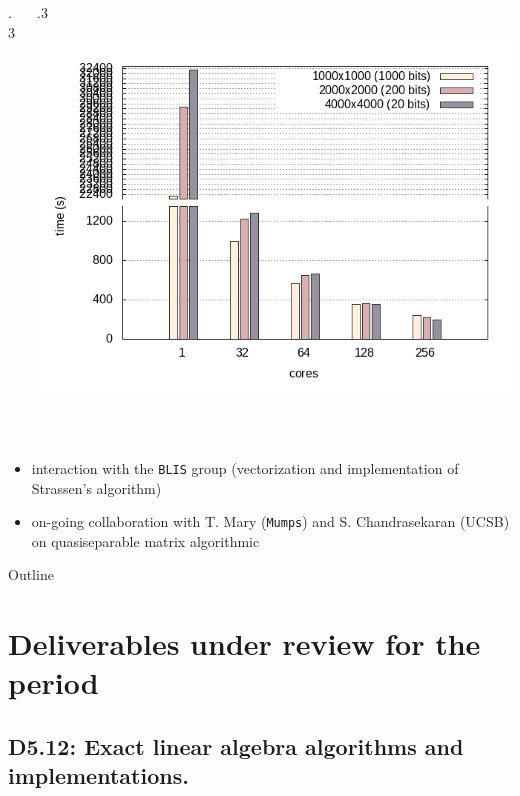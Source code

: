 \documentclass{beamer}
\begin{document}
\begin{frame}
\begin{description}
\begin{columns}
\begin{column} {.3\textwidth}
\begin{center}
        \end{center}
      \end{column}
      \begin{column} {.3\textwidth}
        \begin{center}
          \includegraphics[width=.9\textwidth]{nodes_histogram}
        \end{center}
      \end{column}
    \end{columns}
    \item<3-> [Interactions and  contacts made:]\ 
      {\small
      \begin{itemize}
      \item interaction with the \texttt{BLIS} group (vectorization and
        implementation of Strassen's algorithm)
      \item on-going collaboration with T. Mary (\texttt{Mumps}) and
        S. Chandrasekaran (UCSB) on quasiseparable matrix algorithmic
      \end{itemize}
      }
\end{description}
\end{frame}

\begin{frame}
  {Outline}
  \tableofcontents
\end{frame}

\section{Deliverables under review for the period}
\subsection{D5.12: Exact linear algebra algorithms and implementations.}
\end{document}
